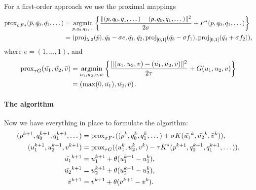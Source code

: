 For a first-order approach we use the proximal mappings
\begin{align*}
    \Prox_{\sigma F*}(\bar{p},\bar{q_0},\bar{q_1},\dots)
    &= \argmin_{p,q_0,q_1,\dots} \left\{
        \frac{\|
            (p,q_0,q_1,\dots)-(\bar{p},\bar{q_0},\bar{q_1},\dots)
        \|^2}{2\sigma} + F^*(p,q_0,q_1,\dots)
    \right\} \\
    &= (
        \proj_{\lambda,2}(\bar{p}),
        \bar{q_0}-\sigma e,
        \bar{q_1},
        \bar{q_2},
        \proj_{[0,1]}(\bar{q_3} - \sigma f_1),
        \proj_{[0,1]}(\bar{q_4} + \sigma f_2)
   ),
\end{align*}
where $e = (1,\dots,1)$, and
\begin{align*}
    \Prox_{\tau G}(\bar{u_1},\bar{u_2},\bar{v})
    &= \argmin_{u_1,u_2,v,w} \left\{
        \frac{\|
            (u_1,u_2,v)-(\bar{u_1},\bar{u_2},\bar{v})
        \|^2}{2\tau} + G(u_1,u_2,v)
    \right\} \\
    &= \left(
        \max(0,\bar{u_1}),
        \bar{u_2},
        \bar{v}
    \right).
\end{align*}

\paragraph{The algorithm}

Now we have everything in place to formulate the algorithm:
\begin{align*}
    (p^{k+1},q_0^{k+1},q_1^{k+1},\dots) &= \operatorname{prox}_{\sigma F^*}(
        (p^{k},q_0^{k},q_1^{k},\dots)
        + \sigma K(\bar{u_1}^{k},\bar{u_2}^{k},\bar{v}^{k})
    ), \\
    (u_1^{k+1},u_2^{k+1},v^{k+1}) &= \operatorname{prox}_{\tau G}(
        (u_1^{k},u_2^{k},v^{k})
        - \tau K^*(p^{k+1},q_0^{k+1},q_1^{k+1},\dots)
    ), \\
    \bar{u_1}^{k+1} &= u_1^{k+1} + \theta(u_1^{k+1}-u_1^{k}), \\
    \bar{u_2}^{k+1} &= u_2^{k+1} + \theta(u_2^{k+1}-u_2^{k}), \\
    \bar{v}^{k+1} &= v^{k+1} + \theta(v^{k+1}-v^{k}).
\end{align*}

